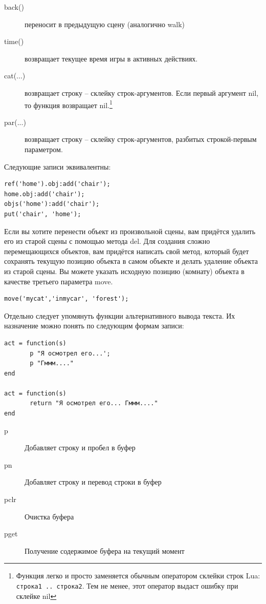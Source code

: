 \documentclass[12pt]{article}
\begin{document}
\begin{description}
\item[back()]  переносит в предыдущую сцену (аналогично walk)
\item[time()]  возвращает текущее время игры в активных действиях.
\item[cat(...)]  возвращает строку -- склейку строк-аргументов. Если первый аргумент nil, то функция возвращает nil.\footnote{Функция легко и просто заменяется обычным оператором склейки строк Lua: \texttt{строка1 .. строка2}. Тем не менее, этот оператор выдаст ошибку при склейке nil}
\item[par(...)]  возвращает строку -- склейку строк-аргументов, разбитых строкой-первым параметром.
\end{description}

Следующие записи эквивалентны:

\begin{verbatim}
ref('home').obj:add('chair');
home.obj:add('chair');
objs('home'):add('chair');
put('chair', 'home');
\end{verbatim}

Если вы хотите перенести объект из произвольной сцены, вам придётся удалить его из старой сцены с помощью метода del. Для создания сложно перемещающихся объектов, вам придётся написать свой метод, который будет сохранять текущую позицию объекта в самом объекте и делать удаление объекта из старой сцены. Вы можете указать исходную позицию (комнату) объекта в качестве третьего параметра move.

\begin{verbatim}
move('mycat','inmycar', 'forest');
\end{verbatim}

Отдельно следует упомянуть функции альтернативного вывода текста. Их назначение можно понять по следующим формам записи:

\begin{verbatim}
act = function(s)
       p "Я осмотрел его...';
       p "Гммм...."
end

act = function(s)
       return "Я осмотрел его... Гммм...."
end
\end{verbatim}

\begin{description}
\item[p]  Добавляет строку и пробел в буфер
\item[pn]  Добавляет строку и перевод строки в буфер
\item[pclr]  Очистка буфера
\item[pget]  Получение содержимое буфера на текущий момент
\end{description}
\end{document}
